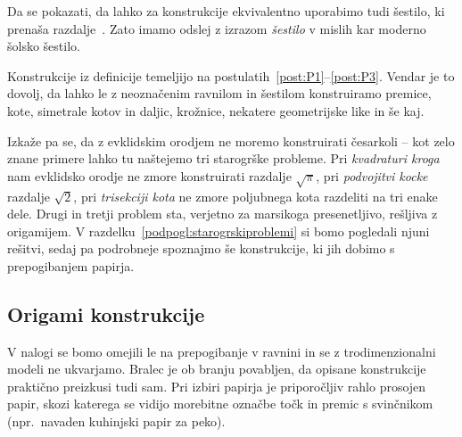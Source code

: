 \begin{opomba}
    \label{opom:solsko_sestilo}
    Da se pokazati, da lahko za konstrukcije ekvivalentno uporabimo tudi šestilo, ki prenaša razdalje~\cite[str.\ 6--7]{geometricconstructions}. Zato imamo odslej z izrazom \emph{šestilo} v mislih kar moderno šolsko šestilo.
\end{opomba}

Konstrukcije iz definicije temeljijo na postulatih~\ref{post:P1}--\ref{post:P3}. Vendar je to dovolj, da lahko le z neoznačenim ravnilom in šestilom konstruiramo premice, kote, simetrale kotov in daljic, krožnice, nekatere geometrijske like in še kaj.

Izkaže pa se, da z evklidskim orodjem ne moremo konstruirati česarkoli -- kot zelo znane primere lahko tu naštejemo tri starogrške probleme. Pri  \emph{kvadraturi kroga} nam evklidsko orodje ne zmore konstruirati razdalje $\sqrt{\pi}$, pri \emph{podvojitvi kocke} razdalje $\sqrt{2}$, pri \emph{trisekciji kota} ne zmore poljubnega kota razdeliti na tri enake dele. Drugi in tretji problem sta, verjetno za marsikoga presenetljivo, rešljiva z origamijem. V razdelku~\ref{podpogl:starogrskiproblemi} si bomo pogledali njuni rešitvi, sedaj pa podrobneje spoznajmo še konstrukcije, ki jih dobimo s prepogibanjem papirja.

\subsection{Origami konstrukcije}
\label{origami_konstrukcije}

V nalogi se bomo omejili le na prepogibanje v ravnini in se z trodimenzionalni modeli ne ukvarjamo. Bralec je ob branju povabljen, da opisane konstrukcije praktično preizkusi tudi sam. Pri izbiri papirja je priporočljiv rahlo prosojen papir, skozi katerega se vidijo morebitne označbe točk in premic s svinčnikom (npr.\ navaden kuhinjski papir za peko).

